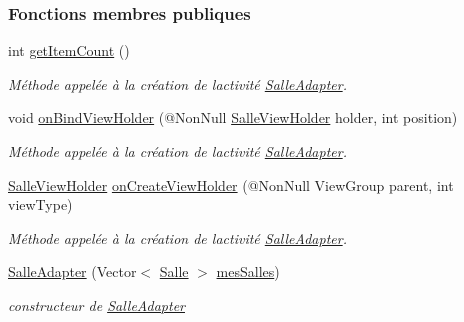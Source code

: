 \subsubsection*{Fonctions membres publiques}
\begin{DoxyCompactItemize}
\item 
int \hyperlink{classcom_1_1lasalle_1_1meeting_1_1_salle_adapter_a4ee9f3c4b020c3bfd88e072bb21bc5fc}{get\+Item\+Count} ()
\begin{DoxyCompactList}\small\item\em Méthode appelée à la création de l\textquotesingle{}activité \hyperlink{classcom_1_1lasalle_1_1meeting_1_1_salle_adapter}{Salle\+Adapter}. \end{DoxyCompactList}\item 
void \hyperlink{classcom_1_1lasalle_1_1meeting_1_1_salle_adapter_ac196b478a0ea01a05455bfe15111406f}{on\+Bind\+View\+Holder} (@Non\+Null \hyperlink{classcom_1_1lasalle_1_1meeting_1_1_salle_view_holder}{Salle\+View\+Holder} holder, int position)
\begin{DoxyCompactList}\small\item\em Méthode appelée à la création de l\textquotesingle{}activité \hyperlink{classcom_1_1lasalle_1_1meeting_1_1_salle_adapter}{Salle\+Adapter}. \end{DoxyCompactList}\item 
\hyperlink{classcom_1_1lasalle_1_1meeting_1_1_salle_view_holder}{Salle\+View\+Holder} \hyperlink{classcom_1_1lasalle_1_1meeting_1_1_salle_adapter_a35aef67b6f83b63fdc9898f6024b24ac}{on\+Create\+View\+Holder} (@Non\+Null View\+Group parent, int view\+Type)
\begin{DoxyCompactList}\small\item\em Méthode appelée à la création de l\textquotesingle{}activité \hyperlink{classcom_1_1lasalle_1_1meeting_1_1_salle_adapter}{Salle\+Adapter}. \end{DoxyCompactList}\item 
\hyperlink{classcom_1_1lasalle_1_1meeting_1_1_salle_adapter_aac5caf27dc7448e1f37868066b3c9d00}{Salle\+Adapter} (Vector$<$ \hyperlink{classcom_1_1lasalle_1_1meeting_1_1_salle}{Salle} $>$ \hyperlink{classcom_1_1lasalle_1_1meeting_1_1_salle_adapter_a3988ff211fbf3052b553d77ba0711a5a}{mes\+Salles})
\begin{DoxyCompactList}\small\item\em constructeur de \hyperlink{classcom_1_1lasalle_1_1meeting_1_1_salle_adapter}{Salle\+Adapter} \end{DoxyCompactList}\end{DoxyCompactItemize}
